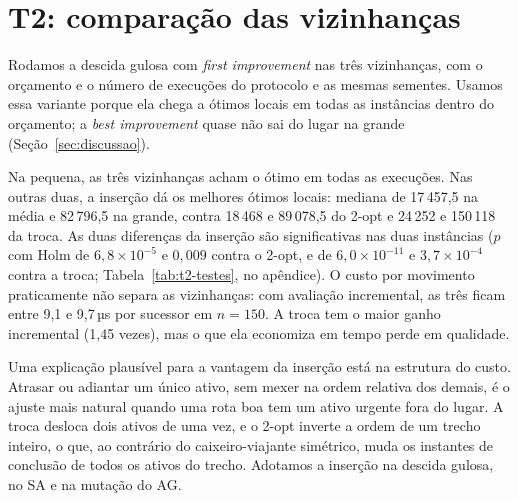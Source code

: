 \section{T2: comparação das vizinhanças}
\label{sec:t2}

Rodamos a descida gulosa com \textit{first improvement} nas três vizinhanças, com o orçamento e o número de execuções do protocolo e as mesmas sementes.
Usamos essa variante porque ela chega a ótimos locais em todas as instâncias dentro do orçamento; a \textit{best improvement} quase não sai do lugar na grande (Seção~\ref{sec:discussao}).

\begin{table}[tbp]
  \centering
  \caption{T2: tamanho da vizinhança, mediana do melhor $h$ por instância e tempo por avaliação de sucessor em $n = 150$ (completa $\to$ incremental).}
  \label{tab:t2}
\end{table}

Na pequena, as três vizinhanças acham o ótimo em todas as execuções.
Nas outras duas, a inserção dá os melhores ótimos locais: mediana de 17\,457,5 na média e 82\,796,5 na grande, contra 18\,468 e 89\,078,5 do 2-opt e 24\,252 e 150\,118 da troca.
As duas diferenças da inserção são significativas nas duas instâncias ($p$ com Holm de $6{,}8\times10^{-5}$ e $0{,}009$ contra o 2-opt, e de $6{,}0\times10^{-11}$ e $3{,}7\times10^{-4}$ contra a troca; Tabela~\ref{tab:t2-testes}, no apêndice).
O custo por movimento praticamente não separa as vizinhanças: com avaliação incremental, as três ficam entre 9,1 e 9,7\,µs por sucessor em $n = 150$.
A troca tem o maior ganho incremental (1,45 vezes), mas o que ela economiza em tempo perde em qualidade.

Uma explicação plausível para a vantagem da inserção está na estrutura do custo.
Atrasar ou adiantar um único ativo, sem mexer na ordem relativa dos demais, é o ajuste mais natural quando uma rota boa tem um ativo urgente fora do lugar.
A troca desloca dois ativos de uma vez, e o 2-opt inverte a ordem de um trecho inteiro, o que, ao contrário do caixeiro-viajante simétrico, muda os instantes de conclusão de todos os ativos do trecho.
Adotamos a inserção na descida gulosa, no SA e na mutação do AG.
